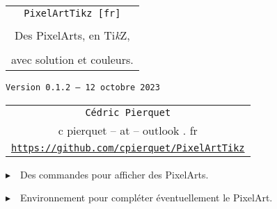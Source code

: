 \documentclass{article}
\def\TPversion{0.1.2}
\def\TPdate{12 octobre 2023}
\begin{document}
\pagestyle{fancy}

\thispagestyle{empty}

\vspace{2cm}

\begin{center}
	\begin{minipage}{0.75\linewidth}
	\begin{tcolorbox}[colframe=yellow,colback=yellow!15]
		\begin{center}
			\begin{tabular}{c}
				{\Huge \texttt{PixelArtTikz [fr]}}\\
				\\
				{\LARGE Des PixelArts, en Ti\textit{k}Z}, \\
				\\
				{\LARGE avec solution et couleurs.} \\
			\end{tabular}
			
			\medskip
			
			{\small \texttt{Version \TPversion{} -- \TPdate}}
		\end{center}
	\end{tcolorbox}
\end{minipage}
\end{center}

\vspace{0.5cm}

\begin{center}
	\begin{tabular}{c}
	\texttt{Cédric Pierquet}\\
	{\ttfamily c pierquet -- at -- outlook . fr}\\
	\texttt{\url{https://github.com/cpierquet/PixelArtTikz}}
\end{tabular}
\end{center}

\vspace{0.25cm}

{$\blacktriangleright$~~Des commandes pour afficher des PixelArts.}

\smallskip

{$\blacktriangleright$~~Environnement pour compléter éventuellement le PixelArt.}

\smallskip

\vspace{1cm}
\end{document}
